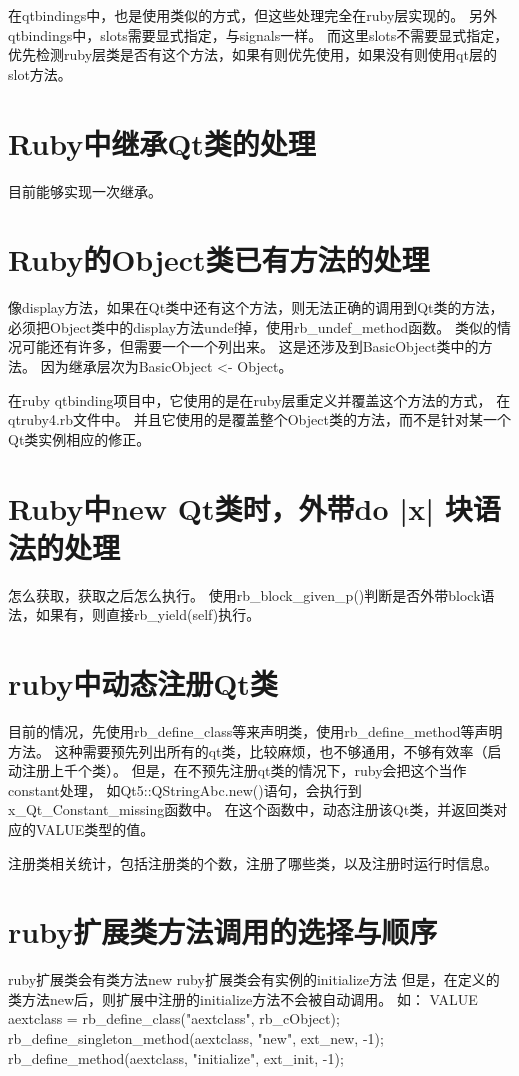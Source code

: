 在qtbindings中，也是使用类似的方式，但这些处理完全在ruby层实现的。
另外qtbindings中，slots需要显式指定，与signals一样。
而这里slots不需要显式指定，优先检测ruby层类是否有这个方法，如果有则优先使用，如果没有则使用qt层的slot方法。

\section{Ruby中继承Qt类的处理}
目前能够实现一次继承。

\section{Ruby的Object类已有方法的处理}
像display方法，如果在Qt类中还有这个方法，则无法正确的调用到Qt类的方法，
必须把Object类中的display方法undef掉，使用rb\_undef\_method函数。
类似的情况可能还有许多，但需要一个一个列出来。
这是还涉及到BasicObject类中的方法。
因为继承层次为BasicObject <- Object。

在ruby qtbinding项目中，它使用的是在ruby层重定义并覆盖这个方法的方式，
在qtruby4.rb文件中。
并且它使用的是覆盖整个Object类的方法，而不是针对某一个Qt类实例相应的修正。

\section{Ruby中new Qt类时，外带do |x| 块语法的处理}
怎么获取，获取之后怎么执行。
使用rb\_block\_given\_p()判断是否外带block语法，如果有，则直接rb\_yield(self)执行。

\section{ruby中动态注册Qt类}
目前的情况，先使用rb\_define\_class等来声明类，使用rb\_define\_method等声明方法。
这种需要预先列出所有的qt类，比较麻烦，也不够通用，不够有效率（启动注册上千个类）。
但是，在不预先注册qt类的情况下，ruby会把这个当作constant处理，
如Qt5::QStringAbc.new()语句，会执行到x\_Qt\_Constant\_missing函数中。
在这个函数中，动态注册该Qt类，并返回类对应的VALUE类型的值。

注册类相关统计，包括注册类的个数，注册了哪些类，以及注册时运行时信息。

\section{ruby扩展类方法调用的选择与顺序}
ruby扩展类会有类方法new
ruby扩展类会有实例的initialize方法
但是，在定义的类方法new后，则扩展中注册的initialize方法不会被自动调用。
如：
VALUE aextclass = rb\_define\_class("aextclass", rb\_cObject);
rb\_define\_singleton\_method(aextclass, "new", ext\_new, -1);
rb\_define\_method(aextclass, "initialize", ext\_init, -1);


